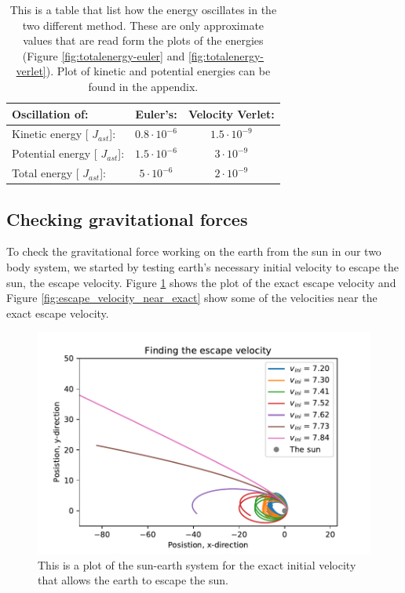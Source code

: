 \begin{table}[H]\caption{This is a table that list how the energy oscillates in the two different method. These are only approximate values that are read form the plots of the energies (Figure \ref{fig:totalenergy-euler} and \ref{fig:totalenergy-verlet}). Plot of kinetic and potential energies can be found in the appendix.} \label{tab:energy_oscillations}
\begin{tabular}{lcc}
\small{Oscillation of:} & \small{Euler's:} & \small{Velocity Verlet:}\\ \hline
\small{Kinetic energy} [ $J_{ast}$]: & $0.8\cdot10^{-6}$ & $1.5 \cdot 10^{-9}$  \\
\small{Potential energy} [ $J_{ast}$]: & $1.5\cdot 10^{-6}$ & $3\cdot10^{-9}$  \\
\small{Total energy} [ $J_{ast}$]:  & $ 5 \cdot 10^{-6}$ & $2\cdot10^{-9}$ \\
\end{tabular}
\end{table}

\subsection{Checking gravitational forces}

To check the gravitational force working on the earth from the sun in our two body system, we started by testing earth's necessary initial velocity to escape the sun, the escape velocity. Figure \ref{fig:escape_velocity_exact} shows the plot of the exact escape velocity and Figure \ref{fig:escape_velocity_near_exact} show some of the velocities near the exact escape velocity.

\begin{figure}[H]
\includegraphics[width=0.9\linewidth]{../results/plots/escape_velocity.pdf}\caption{This is a plot of the sun-earth system for the exact initial velocity that allows the earth to escape the sun.}\label{fig:escape_velocity_exact}
\end{figure}

